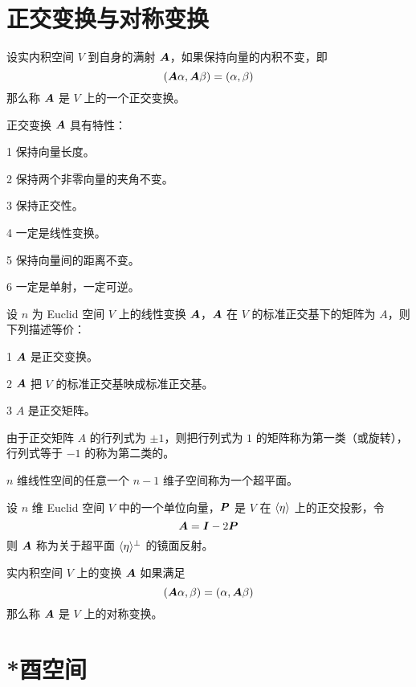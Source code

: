 \section{正交变换与对称变换}

\begin{definition}
    设实内积空间 $V$ 到自身的满射 $\boldsymbol{A}$，如果保持向量的内积不变，即
    \[ (\boldsymbol{A}\alpha,\boldsymbol{A}\beta) = (\alpha,\beta) \]
    那么称 $\boldsymbol{A}$ 是 $V$ 上的一个正交变换。
\end{definition}

\begin{proposition}
    正交变换 $\boldsymbol{A}$ 具有特性：

    \num{1} 保持向量长度。

    \num{2} 保持两个非零向量的夹角不变。

    \num{3} 保持正交性。

    \num{4} 一定是线性变换。

    \num{5} 保持向量间的距离不变。

    \num{6} 一定是单射，一定可逆。
\end{proposition}

\begin{theorem}
    设 $n$ 为 Euclid 空间 $V$ 上的线性变换 $\boldsymbol{A}$，$\boldsymbol{A}$ 在 $V$ 的标准正交基下的矩阵为 $A$，则下列描述等价：

    \num{1} $\boldsymbol{A}$ 是正交变换。

    \num{2} $\boldsymbol{A}$ 把 $V$ 的标准正交基映成标准正交基。

    \num{3} $A$ 是正交矩阵。
\end{theorem}

由于正交矩阵 $A$ 的行列式为 $\pm 1$，则把行列式为 $1$ 的矩阵称为第一类（或旋转），行列式等于 $-1$ 的称为第二类的。

$n$ 维线性空间的任意一个 $n-1$ 维子空间称为一个超平面。

\begin{definition}
    设 $n$ 维 Euclid 空间 $V$ 中的一个单位向量，$\boldsymbol{P}$ 是 $V$ 在 $\langle \eta \rangle$ 上的正交投影，令
    \[ \boldsymbol{A} = \boldsymbol{I} - 2 \boldsymbol{P} \]
    则 $\boldsymbol{A}$ 称为关于超平面 $\langle \eta \rangle^\bot$ 的镜面反射。
\end{definition}

\begin{definition}
    实内积空间 $V$ 上的变换 $\boldsymbol{A}$ 如果满足
    \[ (\boldsymbol{A}\alpha,\beta) = (\alpha,\boldsymbol{A}\beta) \]
    那么称 $\boldsymbol{A}$ 是 $V$ 上的对称变换。
\end{definition}

\section{*酉空间}

